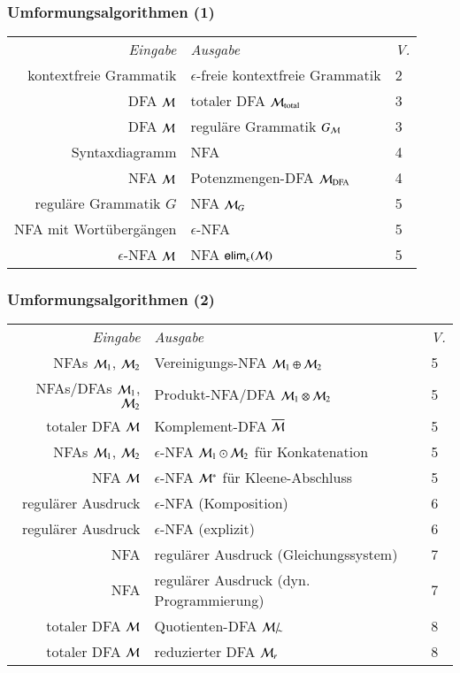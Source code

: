 \documentclass[onlymath]{beamer}
\begin{document}
\begin{frame}[fragile]

\end{frame}

\newcommand{\simquot}[1]{#1/_{\!\!{\sim}}}

\begin{frame}\frametitle{Umformungsalgorithmen (1)}

\begin{tabular}{@{}rll@{}}
\emph{Eingabe} & \emph{Ausgabe} & \emph{V.} \\
kontextfreie Grammatik & $\epsilon$-freie kontextfreie Grammatik & 2\\
DFA $\mathcal{M}$ & totaler DFA $\mathcal{M}_{\text{total}}$ & 3\\
DFA $\mathcal{M}$ & reguläre Grammatik $G_{\mathcal{M}}$ & 3\\
Syntaxdiagramm & NFA & 4\\
NFA $\mathcal{M}$ & Potenzmengen-DFA $\mathcal{M}_{\text{DFA}}$ & 4\\
reguläre Grammatik $G$ & NFA $\mathcal{M}_G$ & 5\\
NFA mit Wortübergängen & $\epsilon$-NFA & 5\\
$\epsilon$-NFA $\mathcal{M}$ & NFA $\textsf{elim}_\epsilon(\mathcal{M})$ & 5
\end{tabular}

\end{frame}

\begin{frame}\frametitle{Umformungsalgorithmen (2)}

\begin{tabular}{@{}rll@{}}
\emph{Eingabe} & \emph{Ausgabe} & \emph{V.} \\
NFAs $\mathcal{M}_1$, $\mathcal{M}_2$ & Vereinigungs-NFA $\mathcal{M}_1\oplus\mathcal{M}_2$ & 5\\
NFAs/DFAs $\mathcal{M}_1$, $\mathcal{M}_2$ & Produkt-NFA/DFA $\mathcal{M}_1\otimes\mathcal{M}_2$ & 5\\
totaler DFA $\mathcal{M}$ & Komplement-DFA $\overline{\mathcal{M}}$ & 5\\
NFAs $\mathcal{M}_1$, $\mathcal{M}_2$ & $\epsilon$-NFA $\mathcal{M}_1\odot\mathcal{M}_2$ für Konkatenation & 5\\
NFA $\mathcal{M}$ & $\epsilon$-NFA $\mathcal{M}^*$ für Kleene-Abschluss & 5\\
regulärer Ausdruck & $\epsilon$-NFA (Komposition) & 6 \\
regulärer Ausdruck & $\epsilon$-NFA (explizit) & 6 \\
NFA & regulärer Ausdruck (Gleichungssystem) & 7 \\
NFA & regulärer Ausdruck (dyn. Programmierung) & 7 \\
totaler DFA $\mathcal{M}$ & Quotienten-DFA $\simquot{\Smach{M}}$ & 8 \\
totaler DFA $\mathcal{M}$ & reduzierter DFA $\mathcal{M}_r$ & 8
\end{tabular}

\end{frame}
\end{document}
